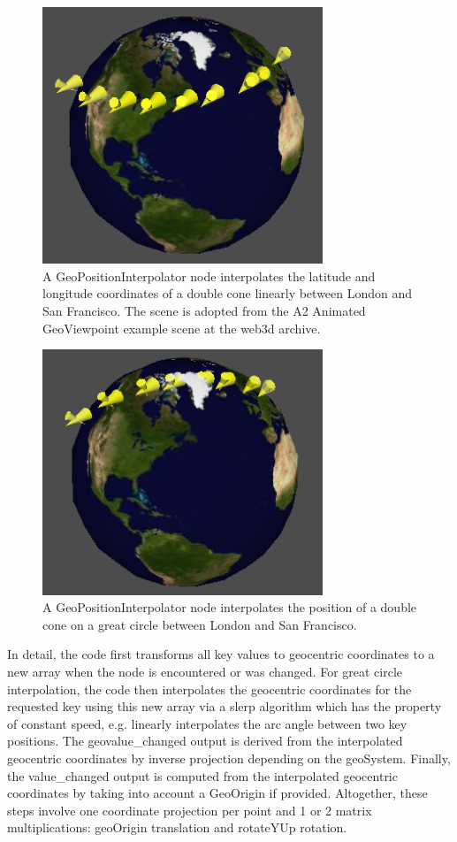 \documentclass[review]{acmsiggraph}            %
\begin{document}
\begin{figure}[htbp] \centering \includegraphics[width=3.3in]{GeoPositionInterpolator1.png}
  \caption{A GeoPositionInterpolator node interpolates the latitude and longitude coordinates of a
  double cone linearly between London and San Francisco. The scene is adopted from the A2 Animated
GeoViewpoint example scene at the web3d archive.} \label{fig:GeoPositionInterpolator1.png}
\end{figure}

\begin{figure}[htbp] \centering \includegraphics[width=3.3in]{GeoPositionInterpolator2.png}
  \caption{A GeoPositionInterpolator node interpolates the position of a double cone on a great
  circle between London and San Francisco.} \label{fig:GeoPositionInterpolator2.png} \end{figure}

In detail, the code first transforms all key values to geocentric coordinates to a new array when
the node is encountered or was changed.  For great circle interpolation, the code then interpolates
the geocentric coordinates for the requested key using this new array via a slerp algorithm
\cite{shoemake1985} which has the property of constant speed, e.g. linearly interpolates the arc angle
between two key positions. The geovalue\_changed output is derived from the interpolated geocentric
coordinates by inverse projection depending on the geoSystem. Finally, the  value\_changed output is
computed from the interpolated geocentric coordinates by taking into account a GeoOrigin if
provided. Altogether, these steps involve one coordinate projection per point and 1 or 2 matrix
multiplications: geoOrigin translation and rotateYUp rotation.
\end{document}
